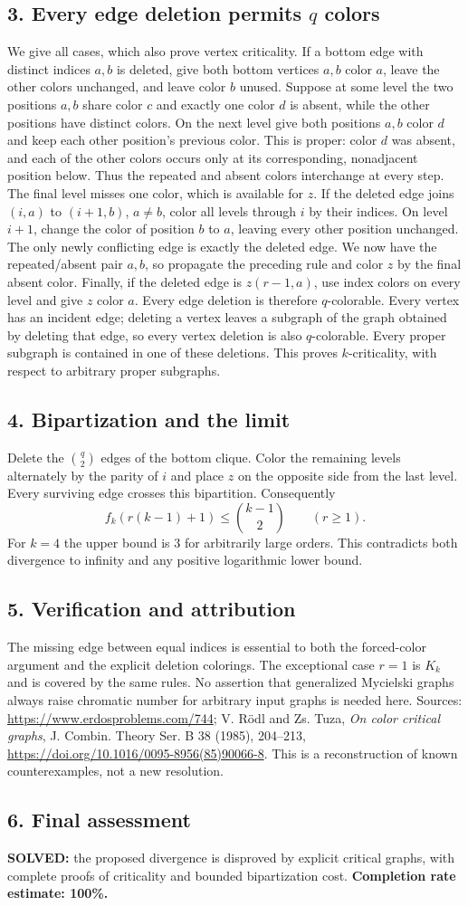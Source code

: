 \subsection*{3. Every edge deletion permits $q$ colors}
We give all cases, which also prove vertex criticality.
If a bottom edge with distinct indices $a,b$ is deleted, give both bottom vertices $a,b$ color $a$, leave the other colors unchanged, and leave color $b$ unused. Suppose at some level the two positions $a,b$ share color $c$ and exactly one color $d$ is absent, while the other positions have distinct colors. On the next level give both positions $a,b$ color $d$ and keep each other position's previous color. This is proper: color $d$ was absent, and each of the other colors occurs only at its corresponding, nonadjacent position below. Thus the repeated and absent colors interchange at every step. The final level misses one color, which is available for $z$.
If the deleted edge joins $(i,a)$ to $(i+1,b)$, $a\ne b$, color all levels through $i$ by their indices. On level $i+1$, change the color of position $b$ to $a$, leaving every other position unchanged. The only newly conflicting edge is exactly the deleted edge. We now have the repeated/absent pair $a,b$, so propagate the preceding rule and color $z$ by the final absent color.
Finally, if the deleted edge is $z(r-1,a)$, use index colors on every level and give $z$ color $a$.
Every edge deletion is therefore $q$-colorable. Every vertex has an incident edge; deleting a vertex leaves a subgraph of the graph obtained by deleting that edge, so every vertex deletion is also $q$-colorable. Every proper subgraph is contained in one of these deletions. This proves $k$-criticality, with respect to arbitrary proper subgraphs.
\subsection*{4. Bipartization and the limit}
Delete the $\binom q2$ edges of the bottom clique. Color the remaining levels alternately by the parity of $i$ and place $z$ on the opposite side from the last level. Every surviving edge crosses this bipartition. Consequently
\[
 f_k(r(k-1)+1)\le\binom{k-1}{2}\qquad(r\ge1).
\]
For $k=4$ the upper bound is $3$ for arbitrarily large orders. This contradicts both divergence to infinity and any positive logarithmic lower bound.
\subsection*{5. Verification and attribution}
The missing edge between equal indices is essential to both the forced-color argument and the explicit deletion colorings. The exceptional case $r=1$ is $K_k$ and is covered by the same rules. No assertion that generalized Mycielski graphs always raise chromatic number for arbitrary input graphs is needed here.
Sources: \url{https://www.erdosproblems.com/744}; V. R\"odl and Zs. Tuza, \emph{On color critical graphs}, J. Combin. Theory Ser. B 38 (1985), 204--213, \url{https://doi.org/10.1016/0095-8956(85)90066-8}. This is a reconstruction of known counterexamples, not a new resolution.
\subsection*{6. Final assessment}
\textbf{SOLVED:} the proposed divergence is disproved by explicit critical graphs, with complete proofs of criticality and bounded bipartization cost.
\textbf{Completion rate estimate: 100\%.}
